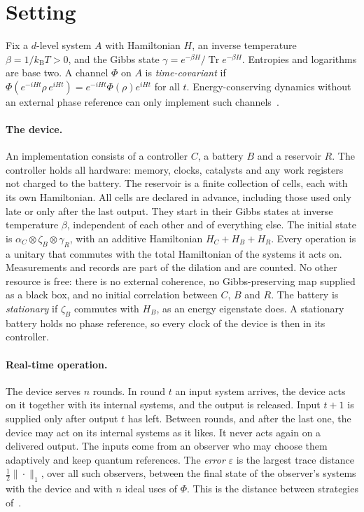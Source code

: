 \documentclass[11pt]{article}
\theoremstyle{definition}
\theoremstyle{remark}
\newcommand{\Tr}{\operatorname{Tr}}
\newcommand{\kB}{k_{\mathrm B}}
\begin{document}
\section{Setting}\label{sec:setting}

Fix a $d$-level system $A$ with Hamiltonian $H$, an inverse temperature $\beta=1/\kB T>0$, and the Gibbs state $\gamma=e^{-\beta H}/\Tr e^{-\beta H}$. Entropies and logarithms are base two. A channel $\Phi$ on $A$ is \emph{time-covariant} if $\Phi(e^{-iHt}\rho\, e^{iHt})=e^{-iHt}\Phi(\rho)e^{iHt}$ for all $t$. Energy-conserving dynamics without an external phase reference can only implement such channels~\cite{Lostaglio15,FBB21}.

\paragraph{The device.} An implementation consists of a controller $C$, a battery $B$ and a reservoir $R$. The controller holds all hardware: memory, clocks, catalysts and any work registers not charged to the battery. The reservoir is a finite collection of cells, each with its own Hamiltonian. All cells are declared in advance, including those used only late or only after the last output. They start in their Gibbs states at inverse temperature $\beta$, independent of each other and of everything else. The initial state is $\alpha_C\otimes\zeta_B\otimes\gamma_R$, with an additive Hamiltonian $H_C+H_B+H_R$. Every operation is a unitary that commutes with the total Hamiltonian of the systems it acts on. Measurements and records are part of the dilation and are counted. No other resource is free: there is no external coherence, no Gibbs-preserving map supplied as a black box, and no initial correlation between $C$, $B$ and $R$. The battery is \emph{stationary} if $\zeta_B$ commutes with $H_B$, as an energy eigenstate does. A stationary battery holds no phase reference, so every clock of the device is then in its controller.

\paragraph{Real-time operation.} The device serves $n$ rounds. In round $t$ an input system arrives, the device acts on it together with its internal systems, and the output is released. Input $t+1$ is supplied only after output $t$ has left. Between rounds, and after the last one, the device may act on its internal systems as it likes. It never acts again on a delivered output. The inputs come from an observer who may choose them adaptively and keep quantum references. The \emph{error} $\varepsilon$ is the largest trace distance $\tfrac12\|\cdot\|_1$, over all such observers, between the final state of the observer's systems with the device and with $n$ ideal uses of $\Phi$. This is the distance between strategies of~\cite{Chiribella08,GutoskiWatrous07}.
\end{document}

